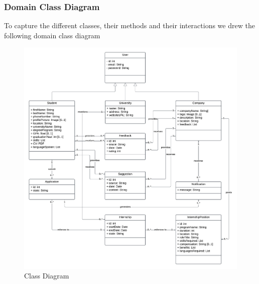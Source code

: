     \newpage
    \subsubsection{Domain Class Diagram}
    To capture the different classes, their methods and their interactions we drew the following domain class diagram
        \begin{figure}[h!]
            \centering
            \includegraphics[width=1\textwidth]{RASD/RASDdiagrams/2.1.2_DomainClassDiagram.png}
            \caption{Class Diagram}
            \label{fig:example}
        \end{figure}
    
    
    \newpage
